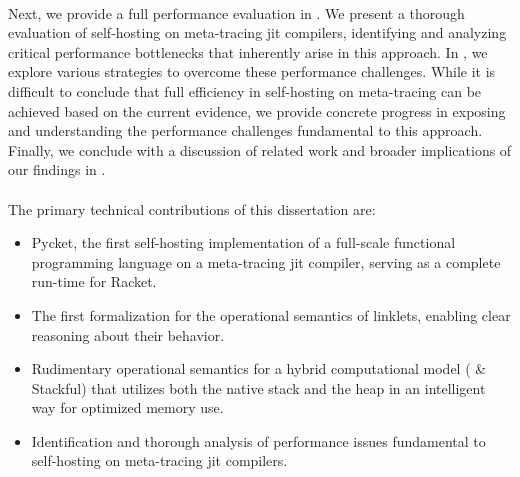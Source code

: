         \paragraph{}%
            Next, we provide a full performance evaluation in . We present a thorough evaluation of self-hosting on meta-tracing \gls{jit} compilers, identifying and analyzing critical performance bottlenecks that inherently arise in this approach. In , we explore various strategies to overcome these performance challenges. While it is difficult to conclude that full efficiency in self-hosting on meta-tracing can be achieved based on the current evidence, we provide concrete progress in exposing and understanding the performance challenges fundamental to this approach. Finally, we conclude with a discussion of related work and broader implications of our findings in .

        \paragraph{}%
            The primary technical contributions of this dissertation are:
            \begin{itemize}
                \item Pycket, the first self-hosting implementation of a full-scale functional programming language on a meta-tracing \gls{jit} compiler, serving as a complete run-time for Racket. %
                \item The first formalization for the operational semantics of linklets, enabling clear reasoning about their behavior. %
                \item Rudimentary operational semantics for a hybrid computational model ( \& Stackful) that utilizes both the native stack and the heap in an intelligent way for optimized memory use. %
                \item Identification and thorough analysis of performance issues fundamental to self-hosting on meta-tracing \gls{jit} compilers. %
            \end{itemize}
